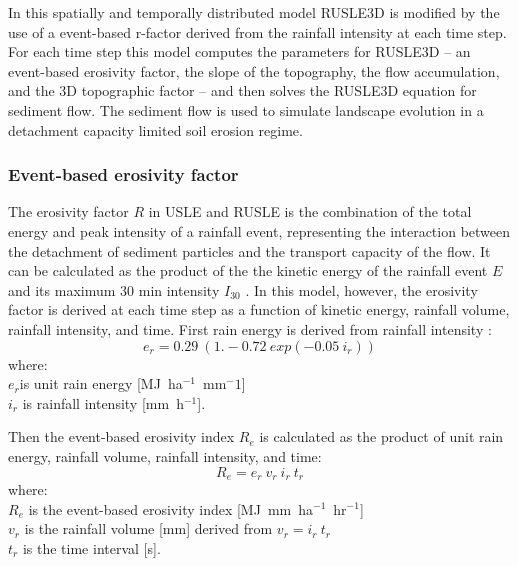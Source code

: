 \documentclass[gmd, manuscript]{copernicus}
\begin{document}
In this spatially and temporally distributed model 
RUSLE3D is modified by the use of a 
event-based r-factor derived from the rainfall intensity 
at each time step.
For each time step
this model computes the parameters for RUSLE3D -- 
an event-based erosivity factor,
the slope of the topography, the flow accumulation, and
the 3D topographic factor -- and then
solves the RUSLE3D equation for sediment flow. 
The sediment flow is used to simulate landscape evolution 
in a detachment capacity limited soil erosion regime.



\subsubsection{Event-based erosivity factor}

The erosivity factor $R$ 
in USLE and RUSLE 
is the combination of the total energy 
and peak intensity of a rainfall event,
representing the interaction 
between the detachment of sediment particles
and the transport capacity of the flow. 
It can be calculated as the product of the 
the kinetic energy of the rainfall event $E$
and its maximum 30 \unit{min} intensity $I_{30}$
\citep{Brown1987,Renard1997}.
In this model, however, the erosivity factor
is derived at each time step as a function of
kinetic energy, rainfall volume, rainfall intensity, and time.
First rain energy is derived from rainfall intensity \citep{Brown1987}:
%
\begin{equation}
\label{eq:rain_energy}
{e_r = 0.29 ~ (1.-0.72 ~ exp(-0.05 ~ i_r))}
\end{equation}
%
{\small
\noindent
where: \\
\noindent
\hspace*{0.5em} $e_r$is unit rain energy [\unit{MJ~ha}$^{-1}$~\unit{mm}${^-1}$]\\
\hspace*{0.5em} $i_r$ is rainfall intensity [\unit{mm~h}$^{-1}$].\\
}

\noindent
Then the event-based erosivity index $R_e$ 
is calculated as the product of 
unit rain energy, rainfall volume, rainfall intensity, and time: 
\begin{equation}
\label{eq:erosivity_index}
{R_e = e_r ~ v_r ~ i_r ~ t_r}
\end{equation}
%
{\small
\noindent
where: \\
\hspace*{0.5em} $R_e$ is the event-based erosivity index [\unit{MJ~mm~ha}$^{-1}$~\unit{hr}$^{-1}$]\\
\hspace*{0.5em} $v_r$ is the rainfall volume [\unit{mm}] derived from ${v_r = i_r~t_r}$\\
\hspace*{0.5em} $t_r$ is the time interval [\unit{s}].
}
\end{document}
